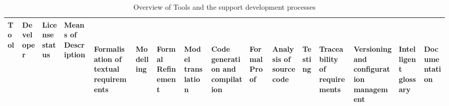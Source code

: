 \documentclass{./template/openetcs_report}
\begin{document}
 \begin{landscape}
 \begin{center}

\begin{longtable}{|m{2.5cm}|p{3cm}|m{1.8cm}|p{3.5cm}||m{1.2cm}|m{0.2cm}|m{0.2cm}|m{0.2cm}|m{0.7cm}|m{0.2cm}|m{0.7cm}|m{0.2cm}|m{0.6cm}|m{1.2cm}|m{0.2cm}|m{0.2cm}|}

\caption{Overview of Tools and the support development processes}
\label{tab: Tools}\\

\hline Tool & Developer & License status & Means of Description & \begin{sideways} {~\parbox{3cm}{Formalisation of textual requirements}}\end{sideways} & \begin{sideways} {~\parbox{3cm}{Modelling}} \end{sideways}& \begin{sideways} {~\parbox{3cm}{Formal Refinement}} \end{sideways} & \begin{sideways} {~\parbox{3cm}{Model translation}} \end{sideways} & \begin{sideways} {~\parbox{3cm}{Code generation and compilation}} \end{sideways} & \begin{sideways} {~\parbox{3cm}{Formal Proof}} \end{sideways} & \begin{sideways} {~\parbox{3cm}{Analysis of source code}} \end{sideways} & \begin{sideways} {~\parbox{3cm}{Testing}} \end{sideways}  & \begin{sideways} {~\parbox{3cm}{Traceability of requirements}} \end{sideways} & \begin{sideways} {~\parbox{3cm}{Versioning and configuration management}} \end{sideways} & \begin{sideways} {~\parbox{3cm}{Intelligent glossary}} \end{sideways} & \begin{sideways} {~\parbox{3cm}{Documentation}} \end{sideways} \\ \hline
\endfirsthead


\end{longtable}
\end{center}
\end{landscape}
\end{document}
